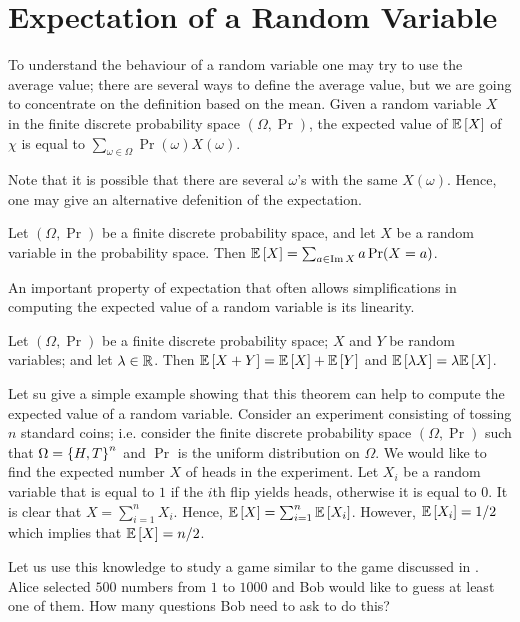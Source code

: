 \chapter{Expectation of a Random Variable}
To understand the behaviour of a random variable one may try to use the average
value; there are several ways to define the average value, but we are going to
concentrate on the definition based on the mean. Given a random variable $X$
in the finite discrete probability space $(\Omega, \Pr)$, the expected value of
$\mathbb{E}\left[X\right]$ of $\chi$ is equal to $\sum_{\omega \in \Omega}
\Pr(\omega) X(\omega)$.

Note that it is possible that there are several $\omega$'s with the same
$X(\omega)$. Hence, one may give an alternative defenition of the expectation.
\begin{theorem}
  Let $(\Omega, \Pr)$ be a finite discrete probability space, and let $X$ be a
  random variable in the probability space. Then $\mathbb{E}\left[X\right] = 
  \sum_{a \in \operatorname{Im} X} a\Pr(X = a)$.
\end{theorem}

An important property of expectation that often allows simplifications in
computing the expected value of a random variable is its linearity.
\begin{theorem}
  Let $(\Omega, \Pr)$ be a finite discrete probability space; $X$ and
  $Y$ be random variables; and let $\lambda \in {\mathbb{R}}$.
  Then $\mathbb{E}\left[X + Y\right] = \mathbb{E}\left[X\right] + \mathbb{E}\left[Y\right]$ and
  $\mathbb{E}\left[\lambda X\right] = \lambda \mathbb{E}\left[X\right]$.
\end{theorem}
Let su give a simple example showing that this theorem can help to compute the
expected value of a random variable. Consider an experiment consisting of
tossing $n$ standard coins; i.e. consider the finite discrete probability space
$(\Omega, \Pr)$ such that $\Omega = \set{H, T}^n$ and $\Pr$ is the uniform
distribution on $\Omega$. We would like to find the expected number $X$ of heads
in the experiment. Let $X_i$ be a random variable that is equal to $1$ if the
$i$th flip yields heads, otherwise it is equal to $0$. It is clear that $X =
\sum_{i = 1}^n X_i$. Hence, $\mathbb{E}\left[X\right] = \sum_{i = 1}^n \mathbb{E}\left[X_i\right]$.
However, $\mathbb{E}\left[X_i\right] = 1 / 2$ which implies that $\mathbb{E}\left[X\right] = n / 2$.

Let us use this knowledge to study a game similar to the game discussed in
. Alice selected $500$ numbers from $1$ to
$1000$ and Bob would like to guess at least one of them. How many questions Bob
need to ask to do this?

